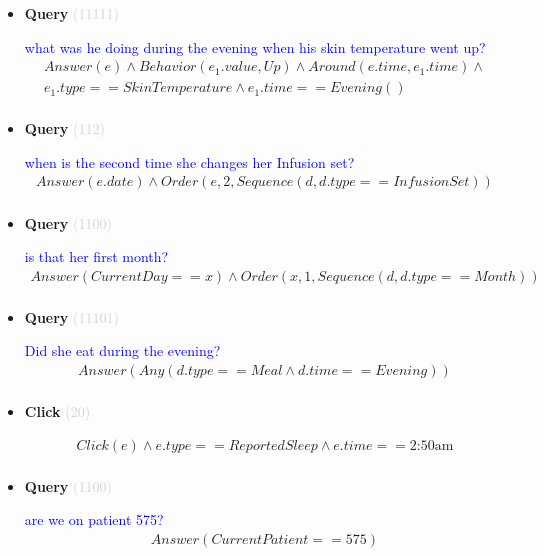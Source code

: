 \documentclass[11pt]{article}
\newcommand{\key}[1]{\textcolor{lightgray}{#1}}
\newcounter{CQuery}
\newcounter{CClick}
\begin{document}
\begin{itemize}
\item
\textbf{Query\theCQuery} \key{(11111)} \addtocounter{CQuery}{1}
\textcolor{blue}{ what was he doing during the evening when his skin temperature went up? }
\begin{multline*}
Answer(e) \wedge Behavior(e_1.value, Up) \wedge Around(e.time, e_1.time) \wedge \\ 
e_1.type==SkinTemperature \wedge e_1.time==Evening() \\ 
\end{multline*}


\item
\textbf{Query\theCQuery} \key{(112)} \addtocounter{CQuery}{1}
\textcolor{blue}{ when is the second time she changes her Infusion set? }
\begin{multline*}
Answer(e.date) \wedge Order(e, 2, Sequence(d, d.type==InfusionSet)) \\ 
\end{multline*}


\item
\textbf{Query\theCQuery} \key{(1100)} \addtocounter{CQuery}{1}
\textcolor{blue}{ is that her first month? }
\begin{multline*}
Answer(CurrentDay==x) \wedge Order(x, 1, Sequence(d, d.type==Month)) \\ 
\end{multline*}


\item
\textbf{Query\theCQuery} \key{(11101)} \addtocounter{CQuery}{1}
\textcolor{blue}{ Did she eat during the evening? }
\begin{multline*}
Answer(Any(d.type==Meal \wedge d.time==Evening)) \\ 
\end{multline*}


\item
\textbf{Click\theCClick} \key{(20)} \addtocounter{CClick}{1}
\textcolor{blue}{  }
\begin{multline*}
Click(e) \wedge e.type==ReportedSleep \wedge e.time==\mbox{2:50am} \\ 
\end{multline*}


\item
\textbf{Query\theCQuery} \key{(1100)} \addtocounter{CQuery}{1}
\textcolor{blue}{ are we on patient 575? }
\begin{multline*}
Answer(CurrentPatient==575) \\ 
\end{multline*}



\end{itemize}
\end{document}
